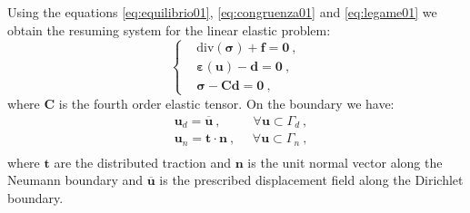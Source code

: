 \documentclass[preprint,12pt,authoryear]{elsarticle}
\begin{document}
Using the equations \eqref{eq:equilibrio01}, \eqref{eq:congruenza01} and \eqref{eq:legame01} we obtain the resuming system for the linear elastic problem:
\begin{equation}\label{eq:system_lin}
\left\lbrace
\begin{split}
& \mbox{div}(\bm{\sigma}) + \bm{f} = \bm{0} \:, \\
& \bm{\varepsilon}(\bm{u}) - \bm{d} = \bm{0} \:, \\
& \bm{\sigma} - \bm{\mathbf{C}}\bm{d} = \bm{0} \:,
\end{split}
\right.
\end{equation}
where $\bm{\mathbf{C}}$ is the fourth order elastic tensor. 
On the boundary we have:
\begin{equation}
\begin{split}
&\bm{u}_{d} = \overline{\bm{u}}\:, \hspace{30pt} \forall\bm{u}\subset \Gamma_{d}\:,\\ 
&\bm{u}_{n} = \bm{t}\cdot \bm{n}\:, \hspace{16pt} \forall\bm{u}\subset \Gamma_{n}\:,\\
\end{split}
\end{equation}
where $\bm{t}$ are the distributed traction and $\bm{n}$ is the unit normal vector along the Neumann boundary and $\overline{\bm{u}}$ is the prescribed displacement field along the Dirichlet boundary.
\end{document}
